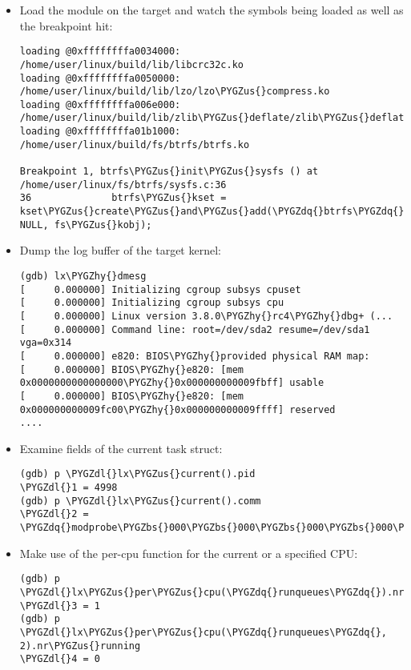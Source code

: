 \documentclass[a4paper,8pt,english]{sphinxmanual}
\def\PYGZbs{\char`\\}
\def\PYGZus{\char`\_}
\def\PYGZdl{\char`\$}
\def\PYGZhy{\char`\-}
\def\PYGZdq{\char`\"}
\begin{document}
\begin{itemize}
\item {} 
Load the module on the target and watch the symbols being loaded as well as
the breakpoint hit:

\begin{Verbatim}[commandchars=\\\{\}]
loading @0xffffffffa0034000: /home/user/linux/build/lib/libcrc32c.ko
loading @0xffffffffa0050000: /home/user/linux/build/lib/lzo/lzo\PYGZus{}compress.ko
loading @0xffffffffa006e000: /home/user/linux/build/lib/zlib\PYGZus{}deflate/zlib\PYGZus{}deflate.ko
loading @0xffffffffa01b1000: /home/user/linux/build/fs/btrfs/btrfs.ko

Breakpoint 1, btrfs\PYGZus{}init\PYGZus{}sysfs () at /home/user/linux/fs/btrfs/sysfs.c:36
36              btrfs\PYGZus{}kset = kset\PYGZus{}create\PYGZus{}and\PYGZus{}add(\PYGZdq{}btrfs\PYGZdq{}, NULL, fs\PYGZus{}kobj);
\end{Verbatim}

\item {} 
Dump the log buffer of the target kernel:

\begin{Verbatim}[commandchars=\\\{\}]
(gdb) lx\PYGZhy{}dmesg
[     0.000000] Initializing cgroup subsys cpuset
[     0.000000] Initializing cgroup subsys cpu
[     0.000000] Linux version 3.8.0\PYGZhy{}rc4\PYGZhy{}dbg+ (...
[     0.000000] Command line: root=/dev/sda2 resume=/dev/sda1 vga=0x314
[     0.000000] e820: BIOS\PYGZhy{}provided physical RAM map:
[     0.000000] BIOS\PYGZhy{}e820: [mem 0x0000000000000000\PYGZhy{}0x000000000009fbff] usable
[     0.000000] BIOS\PYGZhy{}e820: [mem 0x000000000009fc00\PYGZhy{}0x000000000009ffff] reserved
....
\end{Verbatim}

\item {} 
Examine fields of the current task struct:

\begin{Verbatim}[commandchars=\\\{\}]
(gdb) p \PYGZdl{}lx\PYGZus{}current().pid
\PYGZdl{}1 = 4998
(gdb) p \PYGZdl{}lx\PYGZus{}current().comm
\PYGZdl{}2 = \PYGZdq{}modprobe\PYGZbs{}000\PYGZbs{}000\PYGZbs{}000\PYGZbs{}000\PYGZbs{}000\PYGZbs{}000\PYGZbs{}000\PYGZdq{}
\end{Verbatim}

\item {} 
Make use of the per-cpu function for the current or a specified CPU:

\begin{Verbatim}[commandchars=\\\{\}]
(gdb) p \PYGZdl{}lx\PYGZus{}per\PYGZus{}cpu(\PYGZdq{}runqueues\PYGZdq{}).nr\PYGZus{}running
\PYGZdl{}3 = 1
(gdb) p \PYGZdl{}lx\PYGZus{}per\PYGZus{}cpu(\PYGZdq{}runqueues\PYGZdq{}, 2).nr\PYGZus{}running
\PYGZdl{}4 = 0
\end{Verbatim}


\end{itemize}
\end{document}
